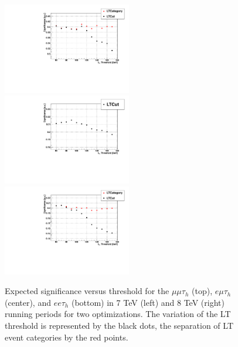 \begin{figure}
  \includegraphics[width=0.5\textwidth]{4_Analisys/pics/8TeV/limits/emt.pdf} \\
  \includegraphics[width=0.5\textwidth]{4_Analisys/pics/7TeV/limits/eet.pdf}
  \includegraphics[width=0.5\textwidth]{4_Analisys/pics/8TeV/limits/eet.pdf} \\
  \caption{Expected significance versus \LT threshold for the $\mu\mu\tau_h$ (top), $e\mu\tau_h$ (center), and $ee\tau_h$ (bottom) in 7 TeV (left) and 8 TeV (right) running periods for two optimizations. The variation of the LT threshold is represented by the black dots, the separation of LT event categories by the red points.}
  \label{fig:LT_scan}
\end{figure}

